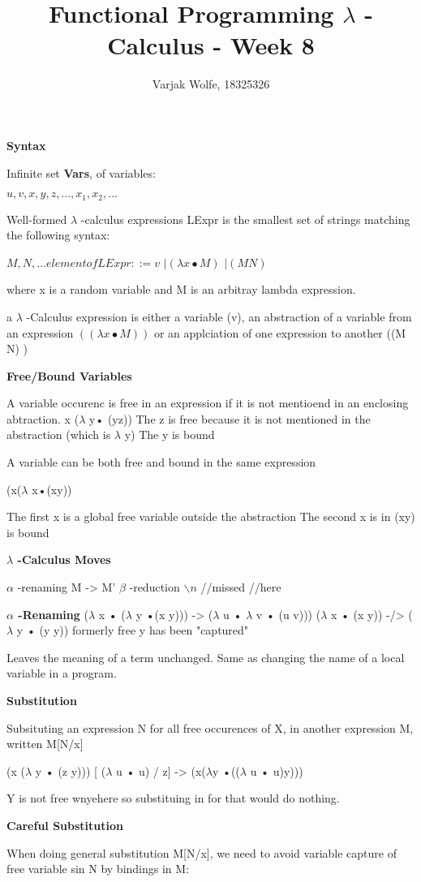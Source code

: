 \documentclass{article}
\title{Functional Programming $\lambda$ -Calculus - Week 8}
\author{Varjak Wolfe, 18325326}
\begin{document}
\textbf{Syntax}

Infinite set \textbf{Vars}, of variables:

$u, v, x, y, z, ..., x_1, x_2,...$

Well-formed $\lambda$ -calculus expressions LExpr is the smallest set of strings matching the following syntax:

	$M,N,... element of LExpr ::= v$
				$	|	(\lambda x • M)$
				$	|	(M N)$

where x is a random variable and M is an arbitray lambda expression.

a $\lambda$ -Calculus expression is either a variable (v), an abstraction of a variable from an expression $((\lambda x • M))$ or an applciation of one expression to another ((M N)
)

\textbf{Free/Bound Variables}

A variable occurenc is free in an expression if it is not mentioend in an enclosing abtraction.
	x 	($\lambda$ y• (yz))
The z is free because it is not mentioned in the abstraction (which is $\lambda$ y)
The y is bound

A variable can be both free and bound in the same expression

(x($\lambda$ x•(xy))

The first x is a global free variable outside the abstraction
The second x is in (xy) is bound


\textbf{$\lambda$ -Calculus Moves}

$\alpha$ -renaming M -> M'
$\beta$ -reduction 
$\backslash n$ //missed
//here

\textbf{$\alpha$ -Renaming}
($\lambda$ x • ($\lambda$ y •(x y))) -> ($\lambda$ u • $\lambda$ v • (u v)))
($\lambda$ x • (x y)) -/> ($\lambda$ y • (y y))
		formerly free y has been "captured"

Leaves the meaning of a term unchanged. Same as changing the name of a local variable in a program. 

\textbf{Substitution}

Subsituting an expression N for all free occurences of X, in another expression M, written M[N/x]

(x ($\lambda$ y • (z y))) [ ($\lambda$ u • u) / z] -> (x($\lambda$y •(($\lambda$ u • u)y)))

Y is not free wnyehere so substituing in for that would do nothing.

\textbf{Careful Substitution}

When doing general substitution M[N/x], we need to avoid variable capture of free variable sin N by bindings in M:
\end{document}
